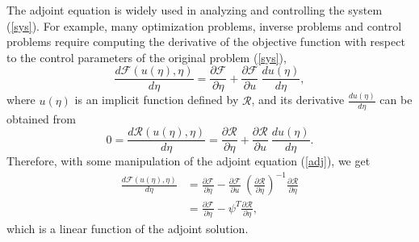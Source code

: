 \documentclass{elsart}
\theoremstyle{remark}
\theoremstyle{definition}
\theoremstyle{proof}
\begin{document}
    The adjoint equation is widely used in analyzing and
    controlling the system (\ref{sys}).  For example, many
    optimization problems, inverse problems and control problems require
    computing the derivative of the objective function with respect to
    the control parameters of the original problem (\ref{sys}),
    \[ \frac{d\mathcal{F}(u(\eta),\eta)}{d\eta}
        = \frac{\partial \mathcal{F}}{\partial \eta} +
          \frac{\partial \mathcal{F}}{\partial u} \: \frac{d u(\eta)}{d \eta},
    \]
    where $u(\eta)$ is an implicit function defined by $\mathcal{R}$, and its
    derivative
    $\frac{d u(\eta)}{d \eta}$ can be obtained from
    \[ 0 = \frac{d\mathcal{R}(u(\eta),\eta)}{d\eta}
         = \frac{\partial \mathcal{R}}{\partial \eta} +
           \frac{\partial \mathcal{R}}{\partial u} \: \frac{d u(\eta)}{d \eta}.
    \]
    Therefore, with some manipulation of the adjoint equation (\ref{adj}),
    we get
    \begin{equation}\label{impder} \begin{split}
        \frac{d\mathcal{F}(u(\eta),\eta)}{d\eta}
        &= \frac{\partial \mathcal{F}}{\partial \eta} -
           \frac{\partial \mathcal{F}}{\partial u} \:
           \left( \frac{\partial \mathcal{R}}{\partial \eta} \right)^{-1}
           \frac{\partial \mathcal{R}}{\partial \eta} \\
        &= \frac{\partial \mathcal{F}}{\partial \eta} -
           \psi^T \frac{\partial \mathcal{R}}{\partial \eta} ,
    \end{split} \end{equation}
    which is a linear function of the adjoint solution.
    
\end{document}
